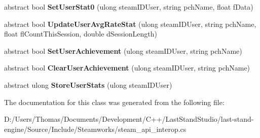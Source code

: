 \begin{DoxyCompactItemize}
\item 
\hypertarget{classValve_1_1Steamworks_1_1ISteamGameServerStats_a04e9d681c3a498dbee9da66c103e2c71}{}abstract bool {\bfseries Set\+User\+Stat0} (ulong steam\+I\+D\+User, string pch\+Name, float f\+Data)\label{classValve_1_1Steamworks_1_1ISteamGameServerStats_a04e9d681c3a498dbee9da66c103e2c71}

\item 
\hypertarget{classValve_1_1Steamworks_1_1ISteamGameServerStats_af4f9e4018acfcb5edce7e22a14391904}{}abstract bool {\bfseries Update\+User\+Avg\+Rate\+Stat} (ulong steam\+I\+D\+User, string pch\+Name, float fl\+Count\+This\+Session, double d\+Session\+Length)\label{classValve_1_1Steamworks_1_1ISteamGameServerStats_af4f9e4018acfcb5edce7e22a14391904}

\item 
\hypertarget{classValve_1_1Steamworks_1_1ISteamGameServerStats_a91cc5fddef5d4ad85ce38e2728b1bc10}{}abstract bool {\bfseries Set\+User\+Achievement} (ulong steam\+I\+D\+User, string pch\+Name)\label{classValve_1_1Steamworks_1_1ISteamGameServerStats_a91cc5fddef5d4ad85ce38e2728b1bc10}

\item 
\hypertarget{classValve_1_1Steamworks_1_1ISteamGameServerStats_a7296600f875e9bac75378e3afeb73441}{}abstract bool {\bfseries Clear\+User\+Achievement} (ulong steam\+I\+D\+User, string pch\+Name)\label{classValve_1_1Steamworks_1_1ISteamGameServerStats_a7296600f875e9bac75378e3afeb73441}

\item 
\hypertarget{classValve_1_1Steamworks_1_1ISteamGameServerStats_a0654f84f3fe0492d3ba5cc1a4b43af22}{}abstract ulong {\bfseries Store\+User\+Stats} (ulong steam\+I\+D\+User)\label{classValve_1_1Steamworks_1_1ISteamGameServerStats_a0654f84f3fe0492d3ba5cc1a4b43af22}

\end{DoxyCompactItemize}


The documentation for this class was generated from the following file\+:\begin{DoxyCompactItemize}
\item 
D\+:/\+Users/\+Thomas/\+Documents/\+Development/\+C++/\+Last\+Stand\+Studio/last-\/stand-\/engine/\+Source/\+Include/\+Steamworks/steam\+\_\+api\+\_\+interop.\+cs\end{DoxyCompactItemize}
